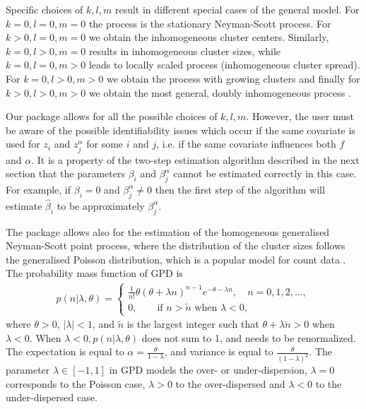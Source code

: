 Specific choices of $k,l,m$ result in different special cases of the general model. For $k = 0, l = 0, m = 0$ the process is the stationary Neyman-Scott process. For $k > 0, l = 0, m = 0$ we obtain the inhomogeneous cluster centers. Similarly, $k = 0, l > 0, m = 0 $ results in inhomogeneous cluster sizes, while $k = 0, l = 0, m > 0$ leads to locally scaled process (inhomogeneous cluster spread). For $k = 0, l > 0, m > 0$ we obtain the process with growing clusters \citep{M2014} and finally for $k > 0, l > 0, m > 0$ we obtain the most general, doubly inhomogeneous process \citep{MS2017}.

Our package allows for all the possible choices of $k, l, m$. However, the user must be aware of the possible identifiability issues which occur if the same covariate is used for $z_i$ and $z_j^\alpha$ for some $i$ and $j$, i.e. if the same covariate influences both $f$ and $\alpha$. It is a property of the two-step estimation algorithm described in the next section that the parameters $\beta_i$ and $\beta_j^\alpha$ cannot be estimated correctly in this case. For example, if $\beta_i = 0$ and $\beta_j^\alpha \neq 0$ then the first step of the algorithm will estimate $\hat\beta_i$ to be approximately $\beta_j^\alpha$.

The  package allows also for the estimation of the homogeneous generalised Neyman-Scott point process, where the distribution of the cluster sizes follows the generalised Poisson distribution, which is a popular model for count data \citep{WF1997}. The probability mass function of GPD is
\begin{align*}
p(n|\lambda, \theta) = \left\{\begin{array}{l} \frac{1}{n!}\theta(\theta + \lambda n)^{n-1}e^{-\theta-\lambda n}, \quad  n = 0, 1, 2, \ldots, \\ 
0, \quad \quad  \text{if } n > \tilde n \text{ when } \lambda <0,
\end{array} \right.
\end{align*}
where $\theta > 0$, $| \lambda | < 1$, and $\tilde n$ is the largest integer such that
$\theta + \lambda \tilde n > 0$ when $\lambda < 0$. When $\lambda < 0, p(n|\lambda, \theta)$ does
not sum to 1, and needs to be renormalized.
The expectation is equal to $\alpha =  \frac{\theta}{1-\lambda}$, \label{eq:E}  and variance is equal to $\frac{\theta}{(1-\lambda)^3}. \label{eq:V}$ The parameter $\lambda \in [-1,1]$ in GPD models the over- or under-dispersion, $\lambda=0$ corresponds to the Poisson case, $\lambda>0$ to the over-dispersed and $\lambda<0$ to the under-dispersed case.

